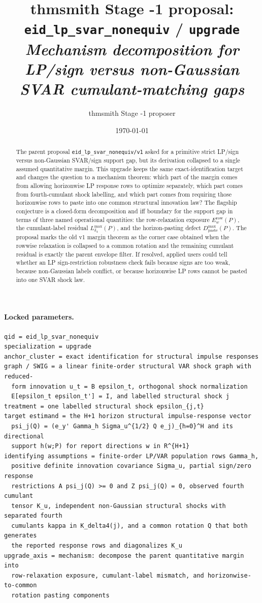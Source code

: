 \documentclass[11pt]{article}
\title{thmsmith Stage -1 proposal: \texttt{eid\_lp\_svar\_nonequiv} / \texttt{upgrade}%
  \\ \large\textit{Mechanism decomposition for LP/sign versus non-Gaussian SVAR cumulant-matching gaps}}
\author{thmsmith Stage -1 proposer}
\date{\today}
\theoremstyle{definition}
\theoremstyle{plain}
\theoremstyle{remark}
\begin{document}
\maketitle


\paragraph{Locked parameters.}
\begin{verbatim}
qid = eid_lp_svar_nonequiv
specialization = upgrade
anchor_cluster = exact identification for structural impulse responses
graph / SWIG = a linear finite-order structural VAR shock graph with reduced-
  form innovation u_t = B epsilon_t, orthogonal shock normalization
  E[epsilon_t epsilon_t'] = I, and labelled structural shock j
treatment = one labelled structural shock epsilon_{j,t}
target estimand = the H+1 horizon structural impulse-response vector
  psi_j(Q) = (e_y' Gamma_h Sigma_u^{1/2} Q e_j)_{h=0}^H and its directional
  support h(w;P) for report directions w in R^{H+1}
identifying assumptions = finite-order LP/VAR population rows Gamma_h,
  positive definite innovation covariance Sigma_u, partial sign/zero response
  restrictions A psi_j(Q) >= 0 and Z psi_j(Q) = 0, observed fourth cumulant
  tensor K_u, independent non-Gaussian structural shocks with separated fourth
  cumulants kappa in K_delta4(j), and a common rotation Q that both generates
  the reported response rows and diagonalizes K_u
upgrade_axis = mechanism: decompose the parent quantitative margin into
  row-relaxation exposure, cumulant-label mismatch, and horizonwise-to-common
  rotation pasting components
\end{verbatim}

\begin{abstract}
The parent proposal \texttt{eid\_lp\_svar\_nonequiv/v1} asked for a primitive strict LP/sign versus non-Gaussian SVAR/sign support gap, but its derivation collapsed to a single assumed quantitative margin.  This upgrade keeps the same exact-identification target and changes the question to a mechanism theorem: which part of the margin comes from allowing horizonwise LP response rows to optimize separately, which part comes from fourth-cumulant shock labelling, and which part comes from requiring those horizonwise rows to paste into one common structural innovation law?  The flagship conjecture is a closed-form decomposition and iff boundary for the support gap in terms of three named operational quantities: the row-relaxation exposure \(E_w^{\mathrm{row}}(P)\), the cumulant-label residual \(L_{\delta_4}^{\max}(P)\), and the horizon-pasting defect \(D_{\mathrm{paste}}^{\max}(P)\).  The proposal marks the old v1 margin theorem as the corner case obtained when the rowwise relaxation is collapsed to a common rotation and the remaining cumulant residual is exactly the parent envelope filter.  If resolved, applied users could tell whether an LP sign-restriction robustness check fails because signs are too weak, because non-Gaussian labels conflict, or because horizonwise LP rows cannot be pasted into one SVAR shock law.
\end{abstract}
\end{document}
